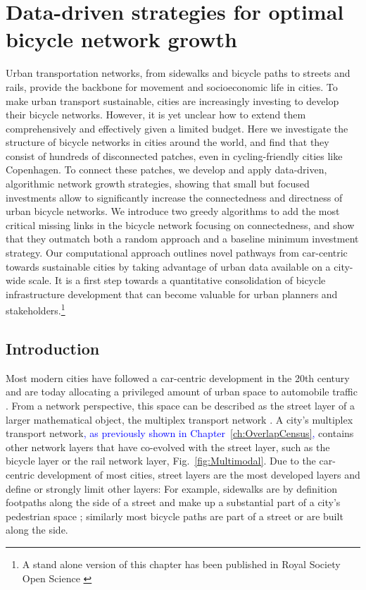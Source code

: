 \chapter{Data-driven strategies for optimal bicycle network growth}

Urban transportation networks, from sidewalks and bicycle paths to streets and rails, provide the backbone for movement and socioeconomic life in cities. To make urban transport sustainable, cities are increasingly investing to develop their bicycle networks. However, it is yet unclear how to extend them comprehensively and effectively given a limited budget. Here we investigate the structure of bicycle networks in cities around the world, and find that they consist of hundreds of disconnected patches, even in cycling-friendly cities like Copenhagen. To connect these patches, we develop and apply data-driven, algorithmic network growth strategies, showing that small but focused investments allow to significantly increase the connectedness and directness of urban bicycle networks. We introduce two greedy algorithms to add the most critical missing links in the bicycle network focusing on connectedness, and show that they outmatch both a random approach and a baseline minimum investment strategy. Our computational approach outlines novel pathways from car-centric towards sustainable cities by taking advantage of urban data available on a city-wide scale. It is a first step towards a quantitative consolidation of bicycle infrastructure development that can become valuable for urban planners and stakeholders.\footnote{A stand alone version of this chapter has been published in Royal Society Open Science \cite{natera2020growth}}



\section{Introduction}

Most modern cities have followed a car-centric development in the 20th century \cite{Jacobs1961Death} and are today allocating a privileged amount of urban space to automobile traffic \cite{Gossling2016Space,Szell2018Crowdsourced}. From a network perspective, this space can be described as the street layer of a larger mathematical object, the multiplex transport network \cite{Morris2012Transport,Strano2015Features,Aleta2017Multilayer}. A city's multiplex transport network\textcolor{blue}{, as previously shown in Chapter~\ref{ch:OverlapCensus},} contains other network layers that have co-evolved with the street layer, such as the bicycle layer or the rail network layer, Fig.~\ref{fig:Multimodal}. Due to the car-centric development of most cities, street layers are the most developed layers and define or strongly limit other layers: For example, sidewalks are by definition footpaths along the side of a street and make up a substantial part of a city's pedestrian space \cite{Gossling2016Space}; similarly most bicycle paths are part of a street or are built along the side.

